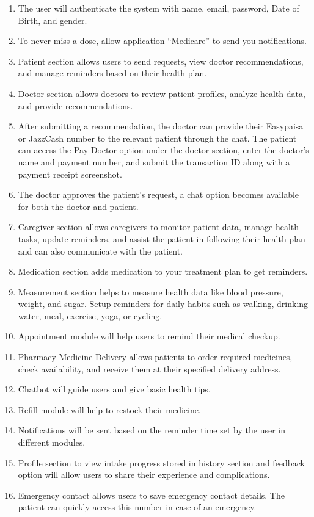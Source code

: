\begin{enumerate}
    \item The user will authenticate the system with name, email, password, Date of Birth, and gender.
    \item To never miss a dose, allow application ``Medicare'' to send you notifications.
    \item Patient section allows users to send requests, view doctor recommendations, and manage reminders based on their health plan.
    \item Doctor section allows doctors to review patient profiles, analyze health data, and provide recommendations.
    \item After submitting a recommendation, the doctor can provide their Easypaisa or JazzCash number to the relevant patient through the chat. The patient can access the Pay Doctor option under the doctor section, enter the doctor's name and payment number, and submit the transaction ID along with a payment receipt screenshot.
    \item The doctor approves the patient's request, a chat option becomes available for both the doctor and patient.
    \item Caregiver section allows caregivers to monitor patient data, manage health tasks, update reminders, and assist the patient in following their health plan and can also communicate with the patient.
    \item Medication section adds medication to your treatment plan to get reminders.
    \item Measurement section helps to measure health data like blood pressure, weight, and sugar. Setup reminders for daily habits such as walking, drinking water, meal, exercise, yoga, or cycling.
    \item Appointment module will help users to remind their medical checkup.
    \item Pharmacy Medicine Delivery allows patients to order required medicines, check availability, and receive them at their specified delivery address.
    \item Chatbot will guide users and give basic health tips.
    \item Refill module will help to restock their medicine.
    \item Notifications will be sent based on the reminder time set by the user in different modules.
    \item Profile section to view intake progress stored in history section and feedback option will allow users to share their experience and complications.
    \item Emergency contact allows users to save emergency contact details. The patient can quickly access this number in case of an emergency.
\end{enumerate}

